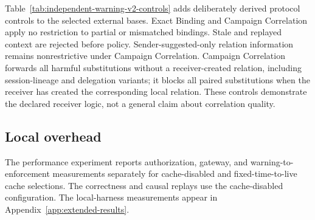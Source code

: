 Table~\ref{tab:independent-warning-v2-controls} adds deliberately derived protocol controls to the selected external bases. Exact Binding and Campaign Correlation apply no restriction to partial or mismatched bindings. Stale and replayed context are rejected before policy. Sender-suggested-only relation information remains nonrestrictive under Campaign Correlation. Campaign Correlation forwards all \ExternalWarningVTwoNoRelationCTwoEForwarded{} harmful substitutions without a receiver-created relation, including \ExternalWarningVTwoSessionNoRelationForwarded{} session-lineage and \ExternalWarningVTwoDelegationNoRelationForwarded{} delegation variants; it blocks all \ExternalWarningVTwoWithRelationCTwoEBlocked{} paired substitutions when the receiver has created the corresponding local relation. These controls demonstrate the declared receiver logic, not a general claim about correlation quality.





\subsection{Local overhead}

The performance experiment reports authorization, gateway, and warning-to-enforcement measurements separately for cache-disabled and fixed-time-to-live cache selections. The correctness and causal replays use the cache-disabled configuration. The local-harness measurements appear in Appendix~\ref{app:extended-results}.
